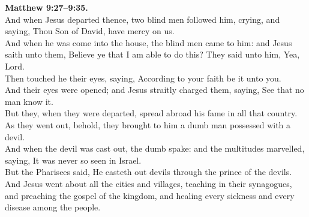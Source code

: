 \documentclass[10pt]{article} %
\begin{document}
{\begin{minipage}[t]{0.45\textwidth}
\textbf{Matthew 9:27--9:35.}\\
And when Jesus departed thence, two blind men followed him, crying, and saying, Thou Son of David, have mercy on us.\\
And when he was come into the house, the blind men came to him: and Jesus saith unto them, Believe ye that I am able to do this? They said unto him, Yea, Lord.\\
Then touched he their eyes, saying, According to your faith be it unto you.\\
And their eyes were opened; and Jesus straitly charged them, saying, See that no man know it.\\
But they, when they were departed, spread abroad his fame in all that country.\\
As they went out, behold, they brought to him a dumb man possessed with a devil.\\
And when the devil was cast out, the dumb spake: and the multitudes marvelled, saying, It was never so seen in Israel.\\
But the Pharisees said, He casteth out devils through the prince of the devils.\\
And Jesus went about all the cities and villages, teaching in their synagogues, and preaching the gospel of the kingdom, and healing every sickness and every disease among the people.\\

\end{minipage}}
\vspace*{\fill}
\newpage
\Huge%
\vspace*{\fill}
\begin{spacing}{1.25}
\end{spacing}
\vspace*{\fill}
\end{document}
